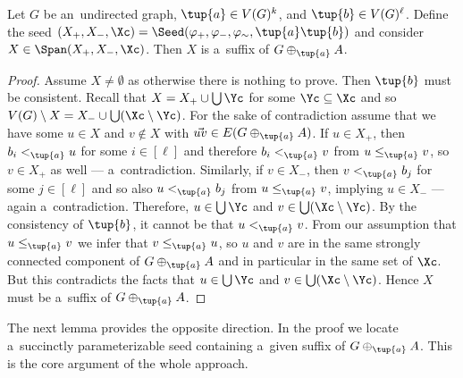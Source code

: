 \begin{lemma}
    \label{lem:param-to-suffix}
    Let $G$ be an~undirected graph, $\tup{a} \in V(G)^k$, and $\tup{b} \in V(G)^\ell$.
    Define the seed $(X_+, X_-, \Xc) = \Seed(\varphi_+, \varphi_-, \varphi_\sim, \tup{a}\tup{b})$ and consider $X \in \Span(X_+, X_-, \Xc)$.
    Then $X$ is a~suffix of $G \oplus_{\tup{a}} A$.
\end{lemma}
\begin{proof}
    Assume $X \neq \emptyset$ as otherwise there is nothing to prove.
    Then $\tup{b}$ must be consistent.
    Recall that $X = X_+ \cup \bigcup \Yc$ for some $\Yc \subseteq \Xc$ and so $V(G) \setminus X = X_- \cup \bigcup (\Xc \setminus \Yc)$.
    For the sake of contradiction assume that we have some $u \in X$ and $v \notin X$ with $\vec{uv} \in E(G \oplus_{\tup{a}} A)$.
    If $u \in X_+$, then $b_i <_{\tup{a}} u$ for some $i \in [\ell]$ and therefore $b_i <_{\tup{a}} v$ from $u \leq_{\tup{a}} v$, so $v \in X_+$ as well --- a~contradiction.
    Similarly, if $v \in X_-$, then $v <_{\tup{a}} b_j$ for some $j \in [\ell]$ and so also $u <_{\tup{a}} b_j$ from $u \leq_{\tup{a}} v$, implying $u \in X_-$ --- again a~contradiction.
    Therefore, $u \in \bigcup \Yc$ and $v \in \bigcup (\Xc \setminus \Yc)$.
    By the consistency of $\tup{b}$, it cannot be that $u <_{\tup{a}} v$.
    From our assumption that $u \leq_{\tup{a}} v$ we infer that $v \leq_{\tup{a}} u$, so $u$ and $v$ are in the same strongly connected component of $G \oplus_{\tup{a}} A$ and in particular in the same set of $\Xc$.
    But this contradicts the facts that $u \in \bigcup \Yc$ and $v \in \bigcup (\Xc \setminus \Yc)$.
    Hence $X$ must be a~suffix of $G \oplus_{\tup{a}} A$.
\end{proof}

The next lemma provides the opposite direction. In the proof we locate a~succinctly parameterizable seed containing a~given suffix of $G \oplus_{\tup{a}} A$. This is the core argument of the whole approach.

